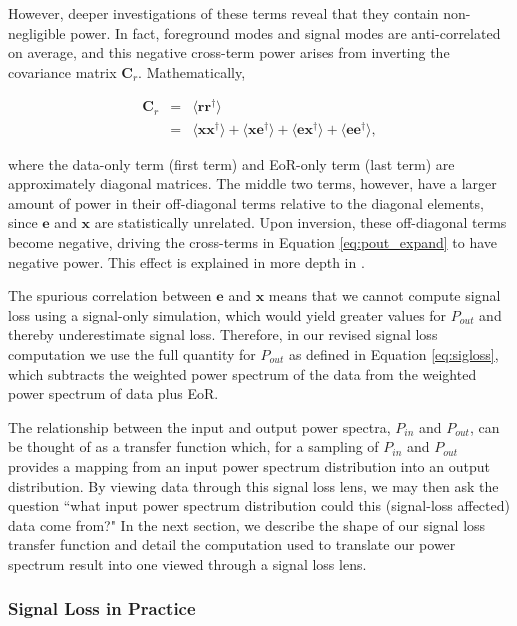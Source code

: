 \documentclass[preprint2,numberedappendix,tighten]{aastex6}  %
\begin{document}
However, deeper investigations of these terms reveal that they contain non-negligible power. In fact, foreground modes and signal modes are anti-correlated on average, and this negative cross-term power arises from inverting the covariance matrix $\textbf{C}_{r}$. Mathematically,

\begin{eqnarray}
\textbf{C}_{r} &=& \langle \textbf{rr}^{\dagger} \rangle \\
&=& \langle \textbf{xx}^{\dagger} \rangle + \langle \textbf{xe}^{\dagger} \rangle + \langle \textbf{ex}^{\dagger} \rangle + \langle \textbf{ee}^{\dagger} \rangle,
\end{eqnarray}

\noindent where the data-only term (first term) and EoR-only term (last term) are approximately diagonal matrices. The middle two terms, however, have a larger amount of power in their off-diagonal terms relative to the diagonal elements, since $\textbf{e}$ and $\textbf{x}$ are statistically unrelated. Upon inversion, these off-diagonal terms become negative, driving the cross-terms in Equation \ref{eq:pout_expand} to have negative power. This effect is explained in more depth in \citet{switzer_et_al2015}. 

The spurious correlation between $\textbf{e}$ and $\textbf{x}$ means that we cannot compute signal loss using a signal-only simulation, which would yield greater values for $P_{out}$ and thereby underestimate signal loss. Therefore, in our revised signal loss computation we use the full quantity for $P_{out}$ as defined in Equation \eqref{eq:sigloss}, which subtracts the weighted power spectrum of the data from the weighted power spectrum of data plus EoR. 

The relationship between the input and output power spectra, $P_{in}$ and $P_{out}$, can be thought of as a transfer function which, for a sampling of $P_{in}$ and $P_{out}$ provides a mapping from an input power spectrum distribution into an output distribution. By viewing data through this signal loss lens, we may then ask the question ``what input power spectrum distribution could this (signal-loss affected) data come from?" In the next section, we describe the shape of our signal loss transfer function and detail the computation used to translate our power spectrum result into one viewed through a signal loss lens.

\subsubsection{Signal Loss in Practice}
\end{document}
